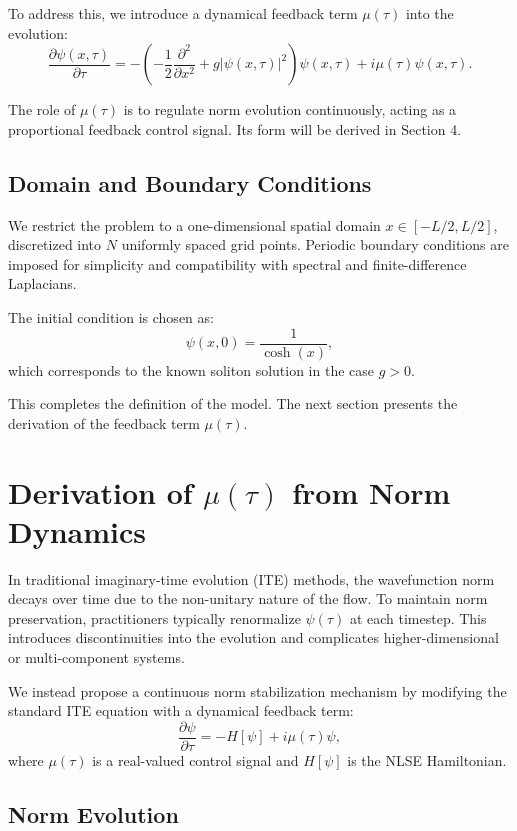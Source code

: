\documentclass[12pt]{article}
\begin{document}
To address this, we introduce a dynamical feedback term $\mu(\tau)$ into the evolution:
\begin{equation}
\frac{\partial \psi(x,\tau)}{\partial \tau} = -\left( -\frac{1}{2} \frac{\partial^2}{\partial x^2} + g |\psi(x,\tau)|^2 \right) \psi(x,\tau) + i \mu(\tau) \psi(x,\tau).
\end{equation}

The role of $\mu(\tau)$ is to regulate norm evolution continuously, acting as a proportional feedback control signal. Its form will be derived in Section 4.

\subsection*{Domain and Boundary Conditions}

We restrict the problem to a one-dimensional spatial domain $x \in [-L/2, L/2]$, discretized into $N$ uniformly spaced grid points. Periodic boundary conditions are imposed for simplicity and compatibility with spectral and finite-difference Laplacians.

The initial condition is chosen as:
\[
\psi(x, 0) = \frac{1}{\cosh(x)},
\]
which corresponds to the known soliton solution in the case $g > 0$.

This completes the definition of the model. The next section presents the derivation of the feedback term $\mu(\tau)$.
\newpage
\section{Derivation of $\mu(\tau)$ from Norm Dynamics}

In traditional imaginary-time evolution (ITE) methods, the wavefunction norm decays over time due to the non-unitary nature of the flow. To maintain norm preservation, practitioners typically renormalize $\psi(\tau)$ at each timestep. This introduces discontinuities into the evolution and complicates higher-dimensional or multi-component systems.

We instead propose a continuous norm stabilization mechanism by modifying the standard ITE equation with a dynamical feedback term:
\begin{equation}
    \frac{\partial \psi}{\partial \tau} = -H[\psi] + i \mu(\tau) \psi,
\end{equation}
where $\mu(\tau)$ is a real-valued control signal and $H[\psi]$ is the NLSE Hamiltonian.

\subsection*{Norm Evolution}
\end{document}
